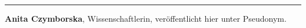 \begin{center}\rule{0.5\linewidth}{\linethickness}\end{center}

\textbf{Anita Czymborska}, Wissenschaftlerin, veröffentlicht hier unter
Pseudonym.
